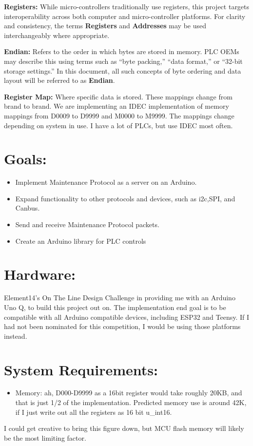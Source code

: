 \documentclass[12pt]{article}
\begin{document}
\textbf{Registers:} While micro-controllers traditionally use registers, this project targets interoperability across both computer and micro-controller platforms. For clarity and consistency, the terms \textbf{Registers} and \textbf{Addresses} may be used interchangeably where appropriate.

\textbf{Endian:} Refers to the order in which bytes are stored in memory. PLC OEMs may describe this using terms such as “byte packing,” “data format,” or “32-bit storage settings.” In this document, all such concepts of byte ordering and data layout will be referred to as \textbf{Endian}.

\textbf{Register Map:} Where specific data is stored. These mappings change from brand to brand. We are implementing an IDEC 
implementation of memory mappings from D0009 to D9999 and M0000 to M9999. The mappings change depending on system in use. I have a lot of PLCs, but use IDEC most often. 

\section*{Goals:}

\begin{itemize}
	\item Implement Maintenance Protocol as a server on an Arduino.
	\item Expand functionality to other protocols and devices, such as i2c,SPI, and Canbus.
	\item Send and receive Maintenance Protocol packets.
	\item Create an Arduino library for PLC controls
\end{itemize}

\section*{Hardware:}
Element14's On The Line Design Challenge in providing me with an Arduino Uno Q, to build this project out on. The implementation end goal is to be compatible with all Arduino compatible devices, including ESP32 and Teensy.
If I had not been nominated for this competition, I would be using those platforms instead. 

\section*{System Requirements:}
\begin{itemize}
\item Memory: ah, D000-D9999 as a 16bit register would take roughly 20KB, and that is just 1/2 of the implementation. 
Predicted memory use is around 42K, if I just write out all the registers as 16 bit u\_int16. 
\end{itemize}
I could get creative to bring this figure down, but MCU flash memory will likely be the most limiting factor. 
\end{document}
